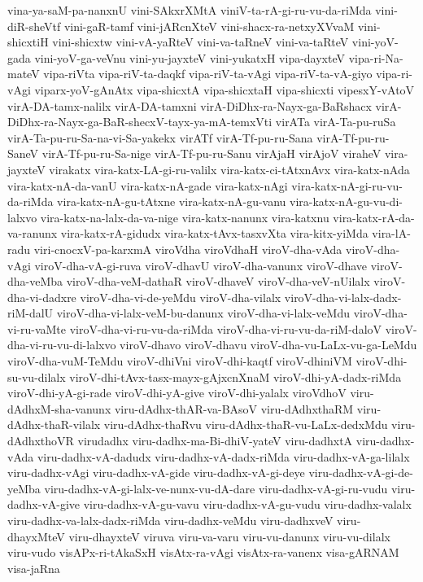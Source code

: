 {vina-ya-saM-pa-nanxnU
vini-SAkxrXMtA
viniV-ta-rA-gi-ru-vu-da-riMda
vini-diR-sheVtf
vini-gaR-tamf
vini-jARcnXteV
vini-shacx-ra-netxyXVvaM
vini-shicxtiH
vini-shicxtw
vini-vA-yaRteV
vini-va-taRneV
vini-va-taRteV
vini-yoV-gada
vini-yoV-ga-veVnu
vini-yu-jayxteV
vini-yukatxH
vipa-dayxteV
vipa-ri-Na-mateV
vipa-riVta
vipa-riV-ta-daqkf
vipa-riV-ta-vAgi
vipa-riV-ta-vA-giyo
vipa-ri-vAgi
viparx-yoV-gAnAtx
vipa-shicxtA
vipa-shicxtaH
vipa-shicxti
vipesxY-vAtoV
virA-DA-tamx-nalilx
virA-DA-tamxni
virA-DiDhx-ra-Nayx-ga-BaRshacx
virA-DiDhx-ra-Nayx-ga-BaR-shecxV-tayx-ya-mA-temxVti
virATa
virA-Ta-pu-ruSa
virA-Ta-pu-ru-Sa-na-vi-Sa-yakekx
virATf
virA-Tf-pu-ru-Sana
virA-Tf-pu-ru-SaneV
virA-Tf-pu-ru-Sa-nige
virA-Tf-pu-ru-Sanu
virAjaH
virAjoV
viraheV
vira-jayxteV
virakatx
vira-katx-LA-gi-ru-valilx
vira-katx-ci-tAtxnAvx
vira-katx-nAda
vira-katx-nA-da-vanU
vira-katx-nA-gade
vira-katx-nAgi
vira-katx-nA-gi-ru-vu-da-riMda
vira-katx-nA-gu-tAtxne
vira-katx-nA-gu-vanu
vira-katx-nA-gu-vu-di-lalxvo
vira-katx-na-lalx-da-va-nige
vira-katx-nanunx
vira-katxnu
vira-katx-rA-da-va-ranunx
vira-katx-rA-gidudx
vira-katx-tAvx-tasxvXta
vira-kitx-yiMda
vira-lA-radu
viri-cnocxV-pa-karxmA
viroVdha
viroVdhaH
viroV-dha-vAda
viroV-dha-vAgi
viroV-dha-vA-gi-ruva
viroV-dhavU
viroV-dha-vanunx
viroV-dhave
viroV-dha-veMba
viroV-dha-veM-dathaR
viroV-dhaveV
viroV-dha-veV-nUilalx
viroV-dha-vi-dadxre
viroV-dha-vi-de-yeMdu
viroV-dha-vilalx
viroV-dha-vi-lalx-dadx-riM-dalU
viroV-dha-vi-lalx-veM-bu-danunx
viroV-dha-vi-lalx-veMdu
viroV-dha-vi-ru-vaMte
viroV-dha-vi-ru-vu-da-riMda
viroV-dha-vi-ru-vu-da-riM-daloV
viroV-dha-vi-ru-vu-di-lalxvo
viroV-dhavo
viroV-dhavu
viroV-dha-vu-LaLx-vu-ga-LeMdu
viroV-dha-vuM-TeMdu
viroV-dhiVni
viroV-dhi-kaqtf
viroV-dhiniVM
viroV-dhi-su-vu-dilalx
viroV-dhi-tAvx-tasx-mayx-gAjxcnXnaM
viroV-dhi-yA-dadx-riMda
viroV-dhi-yA-gi-rade
viroV-dhi-yA-give
viroV-dhi-yalalx
viroVdhoV
viru-dAdhxM-sha-vanunx
viru-dAdhx-thAR-va-BAsoV
viru-dAdhxthaRM
viru-dAdhx-thaR-vilalx
viru-dAdhx-thaRvu
viru-dAdhx-thaR-vu-LaLx-dedxMdu
viru-dAdhxthoVR
virudadhx
viru-dadhx-ma-Bi-dhiV-yateV
viru-dadhxtA
viru-dadhx-vAda
viru-dadhx-vA-dadudx
viru-dadhx-vA-dadx-riMda
viru-dadhx-vA-ga-lilalx
viru-dadhx-vAgi
viru-dadhx-vA-gide
viru-dadhx-vA-gi-deye
viru-dadhx-vA-gi-de-yeMba
viru-dadhx-vA-gi-lalx-ve-nunx-vu-dA-dare
viru-dadhx-vA-gi-ru-vudu
viru-dadhx-vA-give
viru-dadhx-vA-gu-vavu
viru-dadhx-vA-gu-vudu
viru-dadhx-valalx
viru-dadhx-va-lalx-dadx-riMda
viru-dadhx-veMdu
viru-dadhxveV
viru-dhayxMteV
viru-dhayxteV
viruva
viru-va-varu
viru-vu-danunx
viru-vu-dilalx
viru-vudo
visAPx-ri-tAkaSxH
visAtx-ra-vAgi
visAtx-ra-vanenx
visa-gARNAM
visa-jaRna
}
